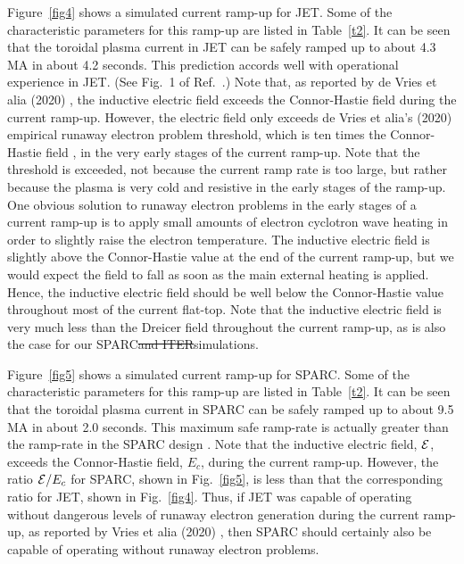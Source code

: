 \documentclass{iopjournal}
\providecommand{\DIFadd}[1]{{\protect\color{blue}\uwave{#1}}} %
\providecommand{\DIFdel}[1]{{\protect\color{red}\sout{#1}}}                      %
\providecommand{\DIFaddbegin}{} %
\providecommand{\DIFaddend}{} %
\providecommand{\DIFdelbegin}{} %
\providecommand{\DIFdelend}{} %
\newcommand{\DIFscaledelfig}{0.5}
\newlength{\DIFdelgraphicswidth} %
\newlength{\DIFdelgraphicsheight} %
\newcommand{\DIFaddincludegraphics}[2][]{{\color{blue}\fbox{\DIFOincludegraphics[#1]{#2}}}} %
\newcommand{\DIFdelincludegraphics}[2][]{%
\sbox{\DIFdelgraphicsbox}{\DIFOincludegraphics[#1]{#2}}%
\settoboxwidth{\DIFdelgraphicswidth}{\DIFdelgraphicsbox} %
\settoboxtotalheight{\DIFdelgraphicsheight}{\DIFdelgraphicsbox} %
\scalebox{\DIFscaledelfig}{%
\parbox[b]{\DIFdelgraphicswidth}{\usebox{\DIFdelgraphicsbox}\\[-\baselineskip] \rule{\DIFdelgraphicswidth}{0em}}\llap{\resizebox{\DIFdelgraphicswidth}{\DIFdelgraphicsheight}{%
\setlength{\unitlength}{\DIFdelgraphicswidth}%
\begin{picture}(1,1)%
\thicklines\linethickness{2pt} %
{\color[rgb]{1,0,0}\put(0,0){\framebox(1,1){}}}%
{\color[rgb]{1,0,0}\put(0,0){\line( 1,1){1}}}%
{\color[rgb]{1,0,0}\put(0,1){\line(1,-1){1}}}%
\end{picture}%
}\hspace*{3pt}}} %
} %
\DeclareRobustCommand{\DIFaddbegin}{\DIFOaddbegin \let\includegraphics\DIFaddincludegraphics} %
\DeclareRobustCommand{\DIFaddend}{\DIFOaddend \let\includegraphics\DIFOincludegraphics} %
\DeclareRobustCommand{\DIFdelbegin}{\DIFOdelbegin \let\includegraphics\DIFdelincludegraphics} %
\DeclareRobustCommand{\DIFdelend}{\DIFOaddend \let\includegraphics\DIFOincludegraphics} %
\begin{document}
Figure~\ref{fig4} shows a simulated current ramp-up for JET. Some of the characteristic  parameters for this ramp-up are listed in Table~\ref{t2}. 
It can be seen that the toroidal plasma current in JET can be safely ramped up to about 4.3 MA in about 4.2 seconds. This prediction accords well
with operational experience in JET. (See Fig.~1 of Ref.~\cite{jet}.)
Note that, as reported by de Vries et alia (2020) \cite{run}, the inductive electric field exceeds the Connor-Hastie field during the current ramp-up. However,
the electric field only exceeds de Vries et alia's (2020) empirical runaway electron problem threshold, which is ten times the Connor-Hastie field \cite{run}, in
the very early stages of the current ramp-up. Note that the threshold is exceeded, not because the current ramp  rate is too large, but rather because the
plasma is very cold and resistive in the early stages of the ramp-up. One obvious solution to runaway electron problems in the early
stages of a current ramp-up is to apply small amounts of electron cyclotron wave heating in order to slightly raise the electron temperature. 
The inductive electric field is slightly above the Connor-Hastie value at the end of the current ramp-up, but we would expect the field to
fall as soon as the main external heating is applied. Hence, the inductive electric field should be well below the Connor-Hastie
value throughout most of the current flat-top. Note that the inductive electric field is very much less than the Dreicer field throughout the current ramp-up, as is also
the case for our SPARC\DIFdelbegin \DIFdel{and ITER}\DIFdelend \DIFaddbegin \DIFadd{,  ITER, and DEMO }\DIFaddend simulations. 

Figure~\ref{fig5} shows a simulated current ramp-up for SPARC. Some of the characteristic  parameters for this ramp-up are listed in Table~\ref{t2}. 
It can be seen that the toroidal plasma current in SPARC can be safely ramped up to about 9.5 MA in about 2.0 seconds. This maximum safe ramp-rate is 
actually greater than the ramp-rate in the SPARC design \cite{creely}. 
Note that the inductive electric field, ${\cal E}$,  exceeds the Connor-Hastie field, $E_c$,  during the current ramp-up. However, the ratio ${\cal E}/E_c$ for SPARC,
shown  in Fig.~\ref{fig5}, is less than that the corresponding ratio for JET,  shown in Fig.~\ref{fig4}. Thus, if JET was capable of
operating without dangerous levels of runaway electron generation during the current ramp-up, as reported by  Vries et alia (2020) \cite{run}, then SPARC
should certainly also be capable of operating without runaway electron problems. 
\end{document}
